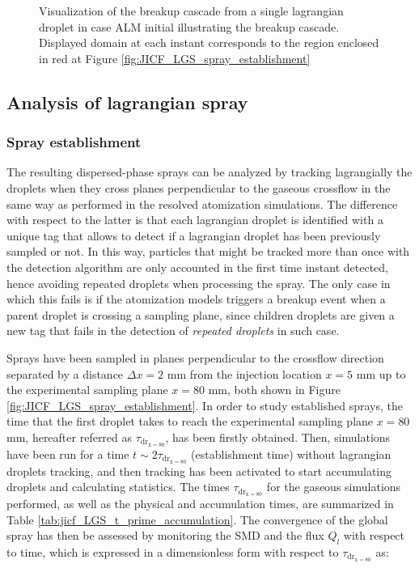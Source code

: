\begin{figure}[h!]
	\centering	{}
	\caption[Visualization of the breakup cascade from a single lagrangian droplet in case ALM initial illustrating the breakup cascade]{Visualization of the breakup cascade from a single lagrangian droplet in case ALM initial illustrating the breakup cascade. Displayed domain at each instant corresponds to the region enclosed in red at Figure \ref{fig:JICF_LGS_spray_establishment}}
	\label{fig:JICF_LGS_breakup_cascade_in_ALM_figure}
\end{figure}

\subsection{Analysis of lagrangian spray}
\label{subsec:jicf_lgs_sed_gas_phase_influence_spray_analysis}

\subsubsection*{Spray establishment}

The resulting dispersed-phase sprays can be analyzed by tracking lagrangially the droplets when they cross planes perpendicular to the gaseous crossflow in the same way as performed in the resolved atomization simulations. The difference with respect to the latter is that each lagrangian droplet is identified with a unique tag that allows to detect if a lagrangian droplet has been previously sampled or not.  In this way, particles that might be tracked more than once with the detection algorithm are only accounted in the first time instant detected, hence avoiding repeated droplets when processing the spray. The only case in which this fails is if the atomization models triggers a breakup event when a parent droplet is crossing a sampling plane, since children droplets are given a new tag that fails in the detection of \textsl{repeated droplets} in such case.

Sprays have been sampled in planes perpendicular to the crossflow direction separated by a distance $\Delta x = 2$ mm from the injection location $x = 5$ mm up to the experimental sampling plane $x = 80$ mm, both shown in Figure \ref{fig:JICF_LGS_spray_establishment}. In order to study established sprays, the time that the first droplet takes to reach the experimental sampling plane $x = 80$ mm, hereafter referred as $\tau_\mathrm{dr_{x=80}}$, has been firstly obtained. Then, simulations have been run for a time $t \sim 2 \tau_\mathrm{dr_{x=80}}$ (establishment time) without lagrangian droplets tracking, and then tracking has been activated to start accumulating droplets and calculating statistics. The times $\tau_\mathrm{dr_{x=80}}$ for the gaseous simulations performed, as well as the physical and accumulation times, are summarized in Table \ref{tab:jicf_LGS_t_prime_accumulation}. The convergence of the global spray has then be assessed by monitoring the SMD and the flux $Q_l$ with respect to time, which is expressed in a dimensionless form with respect to $\tau_\mathrm{dr_{x=80}}$ as:

